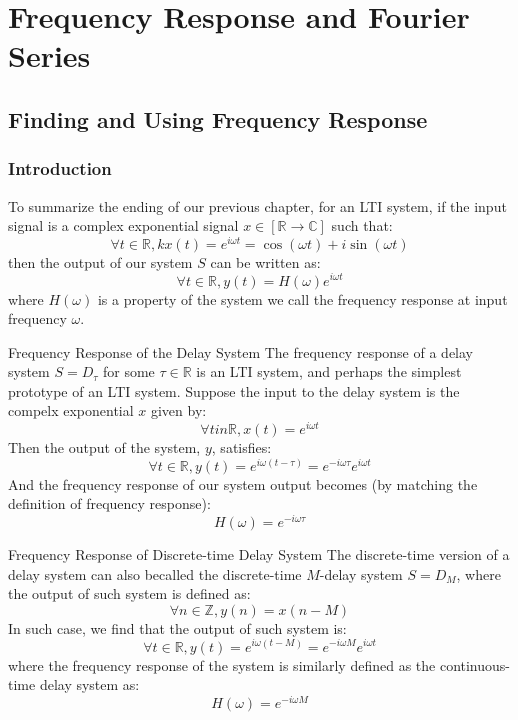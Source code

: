 \chapter{Frequency Response and Fourier Series}

\section{Finding and Using Frequency Response}
\subsection{Introduction}
To summarize the ending of our previous chapter, for an LTI system, if the input signal is a complex exponential signal $x \in [\mathbb{R} \rightarrow \mathbb{C}]$ such that:
\[
    \forall t \in \mathbb{R}, kx(t) = e^{i \omega t} = \cos(\omega t) + i \sin (\omega t)
\]
then the output of our system $S$ can be written as:
\[
    \forall t \in \mathbb{R}, y(t) = H(\omega) e^{i \omega t}
\]
where $H(\omega)$ is a property of the system we call the frequency response at input frequency $\omega$.

\begin{ln-example}{Frequency Response of the Delay System}{}
    The frequency response of a delay system $S = D_\tau$ for some $\tau \in \mathbb{R}$ is an LTI system, and perhaps the simplest prototype of an LTI system.
    Suppose the input to the delay system is the compelx exponential $x$ given by:
    \[
        \forall t in \mathbb{R}, x(t) = e^{i \omega t}
    \]
    Then the output of the system, $y$, satisfies:
    \[
        \forall t \in \mathbb{R}, y(t) = e^{i \omega (t - \tau)} = e^{-i \omega \tau} e^{i \omega t}
    \]
    And the frequency response of our system output becomes (by matching the definition of frequency response):
    \[
        H(\omega) = e^{-i \omega \tau}
    \]
\end{ln-example}
\begin{ln-example}{Frequency Response of Discrete-time Delay System}{}
    The discrete-time version of a delay system can also becalled the discrete-time $M$-delay system $S = D_M$, where the output of such system is defined as:
    \[
        \forall n \in \mathbb{Z}, y(n) = x(n - M)
    \]
    In such case, we find that the output of such system is:
    \[
        \forall t \in \mathbb{R}, y(t) = e^{i \omega (t - M)} = e^{-i \omega M} e^{i \omega t}
    \]
    where the frequency response of the system is similarly defined as the continuous-time delay system as:
    \[
        H(\omega) = e^{-i \omega M}
    \]
\end{ln-example}

